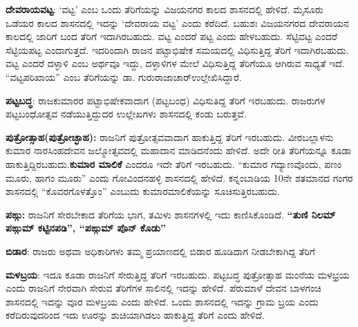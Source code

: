 \textbf{ದೇವರಾಯವಟ್ಟ}: ‘ವಟ್ಟ’ ಎಂಬ ಒಂದು ತೆರಿಗೆಯನ್ನು ವಿಜಯನಗರ ಕಾಲದ ಶಾಸನದಲ್ಲಿ ಹೇಳಿದೆ. ಮೈಸೂರು ಒಡೆಯರ ಕಾಲದ ಶಾಸನದಲ್ಲಿ ಇದನ್ನು ‘ದೇವರಾಯ ವಟ್ಟ’ ಎಂದು ಕರೆದಿದೆ. ಬಹುಶಃ ವಿಜಯನಗರದ ದೇವರಾಯನ ಕಾಲದಲ್ಲಿ ಜಾರಿಗೆ ಬಂದ ತೆರಿಗೆ ಇದಾಗಿರಬಹುದು. ವಟ್ಟ ಎಂದರೆ ಪಟ್ಟ ಎಂದು ಹೇಳಬಹುದು. ಸೆಟ್ಟಿವಟ್ಟ ಎಂದರೆ ಸೆಟ್ಟಿಯಪಟ್ಟ ಎಂದಾಗುತ್ತದೆ. ಇದರಿಂದಾಗಿ ರಾಜನ ಪಟ್ಟಾಭಿಷೇಕ ಸಮಯದಲ್ಲಿ ವಿಧಿಸುತ್ತಿದ್ದ ತೆರಿಗೆ ಇದಾಗಿರಬಹುದು. ವಟ್ಟ ಎಂದರೆ ದಳ್ಳಾಳಿ ಎಂಬ ಅರ್ಥವೂ ಇದ್ದು, ದಳ್ಳಾಳಿಗಳ ಮೇಲೆ ವಿಧಿಸುತ್ತಿದ್ದ ತೆರಿಗೆಯೂ ಆಗಿರುವ ಸಾಧ್ಯತೆ ಇದೆ. “ವಟ್ಟಪರಿಖಾಯ” ಎಂಬ ತೆರಿಗೆಯನ್ನು ಡಾ. ಗುರುರಾಜಾಚಾರ್​ ಉಲ್ಲೇಖಿಸಿದ್ದಾರೆ.

\textbf{ಪಟ್ಟಬದ್ಧ}: ರಾಜಕುಮಾರರ ಪಟ್ಟಾಭಿಷೇಕವಾದಾಗ (ಪಟ್ಟಬಂಧ) ವಿಧಿಸುತಿದ್ದ ತೆರಿಗೆ ಇರಬಹುದು. ರಾಜರುಗಳ ಪಟ್ಟಬಂಧೋತ್ಸವ ನಡೆಯುತ್ತಿದ್ದುದರ ಉಲ್ಲೇಖಗಳು ಶಾಸನದಲ್ಲಿ ಕಂಡು ಬರುತ್ತವೆ.

\textbf{ಪುತ್ರೋತ್ಸಾಹ}\textbf{(ಪುತ್ರೋಚ್ಛಾಹ):} ರಾಜನಿಗೆ ಪುತ್ರೋತ್ಸವವಾದಾಗ ಹಾಕುತ್ತಿದ್ದ ತೆರಿಗೆ ಇರಬಹುದು. ವೀರಬಲ್ಲಾಳನು ಕುಮಾರ ನಾರಸಿಂಹದೇವನ ಜಲ್ಮೋತ್ಸವದಲ್ಲಿ ಮಹಾದಾನ ಮಾಡಿದನೆಂದು ಹೇಳಿದೆ. ಅದೇ ರೀತಿ ತೆರಿಗೆಯನ್ನೂ ಕೂಡಾ ಹಾಕುತ್ತಿದ್ದಿರಬಹುದು.\textbf{ಕುಮಾರ ಮಾಲಿಕೆ} ಎಂದರೂ ಇದೇ ತೆರಿಗೆ ಇರಬಹುದು. “ಕುಮಾರ ಗದ್ಯಾಣವೊಂದು, ಪಣಂ ಮೂರು, ಹಾಗಂ ಮೂರು” ಎಂದು ಗೋವಿಂದನಹಳ್ಳಿ ಶಾಸನದಲ್ಲಿ ಹೇಳಿದೆ. ಕನ್ನಂಬಾಡಿಯ 10ನೇ ಶತಮಾನದ ಗಂಗರ ಶಾಸನದಲ್ಲಿ “ಕೊವರಗೊಳತ್ತೊಂ” ಎಂಬುದು ಕುಮಾರಮಾಲಿಕೆಯನ್ನು ಸೂಚಿಸುತ್ತಿರಬಹುದು.

\textbf{ಪಙ್ಗು:} ರಾಜನಿಗೆ ಸೇರಬೇಕಾದ ತೆರಿಗೆಯ ಭಾಗ, ತಮಿಳು ಶಾಸನಗಳಲ್ಲಿ ಇದು ಕಾಣಿಸಿಕೊಂಡಿದೆ. \textbf{“ತುಣಿ ನಿಲಮ್ ಪಙ್ಗುಮ್ ಕಟ್ಟಿನಪಡಿ”, “ಪಙ್ಗುಮ್ ಪೊನ್​ ಕೊಡು”}

\textbf{ಬಿಡಾರ}: ರಾಜರು ಅಥವಾ ಅಧಿಕಾರಿಗಳು ತಮ್ಮ ಪ್ರಯಾಣದಲ್ಲಿ ಬಿಡಾರ ಹೂಡಿದಾಗ ನೀಡಬೇಕಾಗಿದ್ದ ತೆರಿಗೆ 

\textbf{ಮಳಬ್ರಯ}: ಇದೂ ಕೂಡಾ ರಾಜನಿಗೆ ಸೇರುತ್ತಿದ್ದ ತೆರಿಗೆ ಇರಬಹುದು. ಪಟ್ಟಬದ್ಧ ಪುತ್ರೋತ್ಸಾಹ ಮಂನೆಯ ಮಳಭ್ರಯ ಎಂದು ರಾಜನಿಗೆ ನೇರವಾಗಿ ಸೇರುವ ತೆರಿಗೆಗಳ ಸಾಲಿನಲ್ಲಿ ಇದನ್ನು ಹೇಳಿದೆ. ಪೆರುಮಾಳೆ ದೇವನ ಬಾಳಗಂಚಿ ಶಾಸನದಲ್ಲಿ ಇದನ್ನು ವೂರ ಮಳಬ್ರಯ ಎಂದು ಹೇಳಿದೆ. ಒಂದು ಶಾಸನದಲ್ಲಿ ಇದನ್ನು ಗ್ರಾಮ ಬ್ರಯ ಎಂದು ಕರೆದಿರುವುದರಿಂದ ಇದು ಊರನ್ನು ಶುಚಿಯಾಗಿಡಲು ಹಾಕುತ್ತಿದ್ದ ತೆರಿಗೆ ಎಂದು ಹೇಳಿದೆ.

